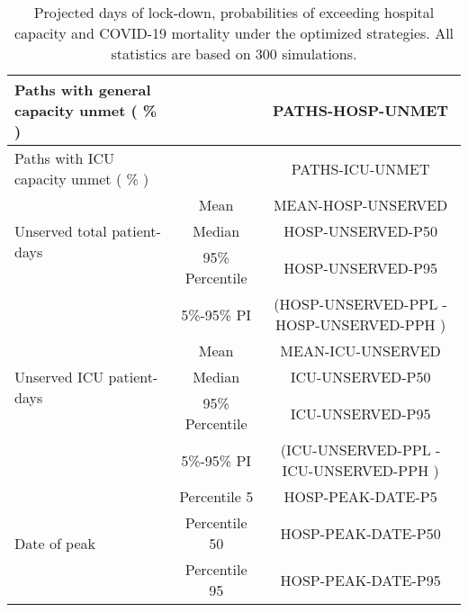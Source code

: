 \documentclass{article}
\begin{document}
\begin{table}[th]
\begin{tabular}{p{4cm}cc}
\multirow{1}{*}{Paths with general capacity unmet ( \% )} &      &         PATHS-HOSP-UNMET              \\   \midrule 
\multirow{1}{*}{Paths with ICU capacity unmet ( \% )} &      &         PATHS-ICU-UNMET              \\   \midrule 
\multirow{3}{\hsize}{Unserved total patient-days} & Mean & MEAN-HOSP-UNSERVED  \\ \cmidrule(l){2-3}
									& Median & HOSP-UNSERVED-P50  \\ \cmidrule(l){2-3} 
									& 95\% Percentile     & HOSP-UNSERVED-P95    \\ \cmidrule(l){2-3} 
									& 5\%-95\% PI & (HOSP-UNSERVED-PPL - HOSP-UNSERVED-PPH )       \\ \midrule
\multirow{3}{\hsize}{Unserved ICU patient-days} & Mean & MEAN-ICU-UNSERVED  \\ \cmidrule(l){2-3}
									& Median & ICU-UNSERVED-P50  \\ \cmidrule(l){2-3} 
									& 95\% Percentile     & ICU-UNSERVED-P95    \\ \cmidrule(l){2-3} 
									& 5\%-95\% PI & (ICU-UNSERVED-PPL - ICU-UNSERVED-PPH )       \\ \midrule
									
\multirow{3}{\hsize}{Date of peak}   & Percentile 5      & HOSP-PEAK-DATE-P5   \\ \cmidrule(l){2-3} 
                                     & Percentile 50     & HOSP-PEAK-DATE-P50    \\ \cmidrule(l){2-3} 
                                     & Percentile 95     & HOSP-PEAK-DATE-P95     \\  \bottomrule

\end{tabular}
\caption{Projected days of lock-down, probabilities of exceeding hospital capacity and COVID-19 mortality under the optimized strategies. All statistics are based on 300 simulations.}

\label{table:summary_table}
\end{table}
\end{document}
